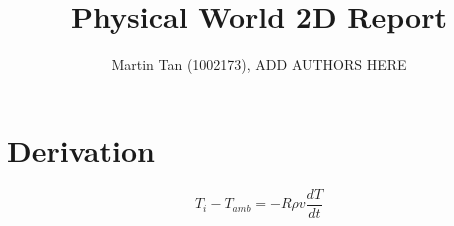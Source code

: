 \documentclass[12pt,a4paper]{IEEEtran}
\author{Martin Tan (1002173), ADD AUTHORS HERE}
\title{Physical World 2D Report}
\begin{document}
	\maketitle
	\section{Derivation}
	$$T_i - T_{amb} = -R \rho v \frac{dT}{dt}$$
\end{document}
